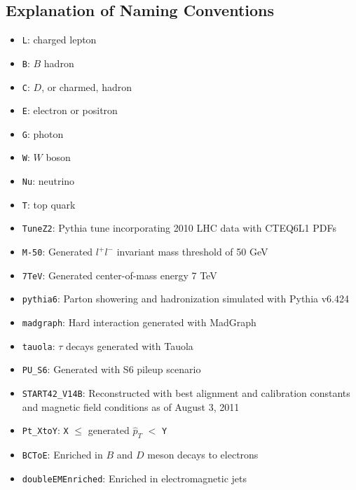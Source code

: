 \documentclass[dissertation.tex]{subfiles}
\begin{document}
\subsection{Explanation of Naming Conventions}
\label{sec:Explanation of Naming Conventions}

\begin{itemize}
\item \verb+L+: charged lepton
\item \verb+B+: $B$ hadron
\item \verb+C+: $D$, or charmed, hadron
\item \verb+E+: electron or positron
\item \verb+G+: photon
\item \verb+W+: $W$ boson
\item \verb+Nu+: neutrino
\item \verb+T+: top quark
\item \verb+TuneZ2+: Pythia tune incorporating 2010 LHC data with CTEQ6L1 \cite{CTEQ6} PDFs \cite{LPCC_MBUE_WG}
\item \verb+M-50+: Generated $l^{+}l^{-}$ invariant mass threshold of 50 GeV
\item \verb+7TeV+: Generated center-of-mass energy 7 TeV
\item \verb+pythia6+: Parton showering and hadronization simulated with Pythia v6.424 \cite{Pythia6}
\item \verb+madgraph+: Hard interaction generated with MadGraph \cite{MadGraph}
\item \verb+tauola+: $\tau$ decays generated with Tauola \cite{Tauola}
\item \verb+PU_S6+: Generated with S6 pileup scenario %
\item \verb+START42_V14B+: Reconstructed with best alignment and calibration constants and magnetic field conditions as of August 3, 2011
\item \verb+Pt_XtoY+: \verb+X+ $\leq$ generated $\hat{p}_{T}$ $<$ \verb+Y+
\item \verb+BCToE+: Enriched in $B$ and $D$ meson decays to electrons
\item \verb+doubleEMEnriched+: Enriched in electromagnetic jets %
\end{itemize}
\end{document}
